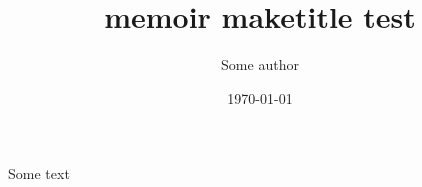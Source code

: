 \documentclass{memoir-tagging}
\title{memoir maketitle test}
\author{Some author} %
\date{\today}
\begin{document}
\maketitle
Some text
\end{document}
